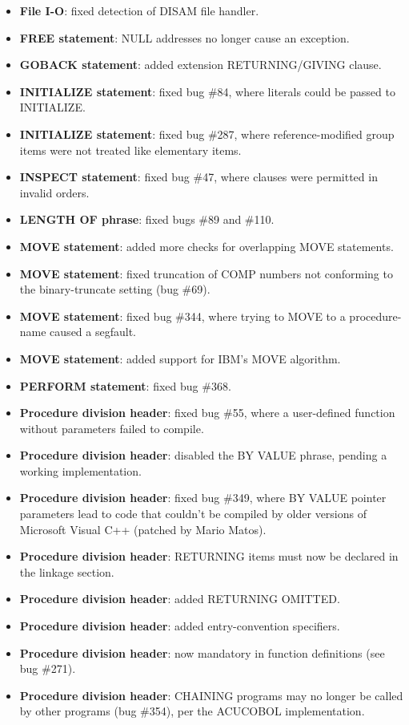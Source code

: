 \begin{itemize}
\item \textbf{File I-O}: fixed detection of DISAM file handler.
\item \textbf{FREE statement}: NULL addresses no longer cause an exception.
\item \textbf{GOBACK statement}: added extension RETURNING\slash{}GIVING clause.
\item \textbf{INITIALIZE statement}: fixed bug \#84, where literals could be passed to INITIALIZE.
\item \textbf{INITIALIZE statement}: fixed bug \#287, where reference-modified group items were not treated like elementary items.
\item \textbf{INSPECT statement}: fixed bug \#47, where clauses were permitted in invalid orders.
\item \textbf{LENGTH OF phrase}: fixed bugs \#89 and \#110.
\item \textbf{MOVE statement}: added more checks for overlapping MOVE statements.
\item \textbf{MOVE statement}: fixed truncation of COMP numbers not conforming to the binary-truncate setting (bug \#69).
\item \textbf{MOVE statement}: fixed bug \#344, where trying to MOVE to a procedure-name caused a segfault.
\item \textbf{MOVE statement}: added support for IBM's MOVE algorithm.
\item \textbf{PERFORM statement}: fixed bug \#368.
\item \textbf{Procedure division header}: fixed bug \#55, where a user-defined function without parameters failed to compile.
\item \textbf{Procedure division header}: disabled the BY VALUE phrase, pending a working implementation.
\item \textbf{Procedure division header}: fixed bug \#349, where BY VALUE pointer parameters lead to code that couldn't be compiled by older versions of Microsoft Visual C++ (patched by Mario Matos).
\item \textbf{Procedure division header}: RETURNING items must now be declared in the linkage section.
\item \textbf{Procedure division header}: added RETURNING OMITTED.
\item \textbf{Procedure division header}: added entry-convention specifiers.
\item \textbf{Procedure division header}: now mandatory in function definitions (see bug \#271).
\item \textbf{Procedure division header}: CHAINING programs may no longer be called by other programs (bug \#354), per the ACUCOBOL implementation.

\end{itemize}
